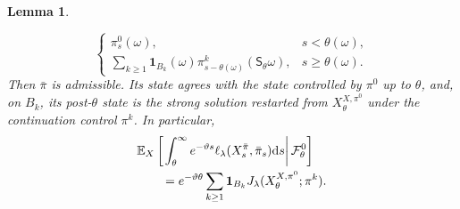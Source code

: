 \documentclass[11pt]{article}
\def\E{\mathbb{E}}
\def\Fc{{\mathcal F}}
\def\id{\mathbf{1}}
\newcommand{\dd}{\mathrm{d}}
\newtheorem{lemma}[theorem]{Lemma}
\theoremstyle{definition}
\theoremstyle{remark}
\numberwithin{equation}{section}
\begin{document}
\begin{lemma}
\begin{enumerate}[label=\textup{(\roman*)},leftmargin=2.3em]
\begin{equation}
\begin{cases}
  \pi_s^0(\omega),&s<\theta(\omega),\\[1mm]
  \displaystyle
  \sum_{k\ge1}\id_{B_k}(\omega)
  \pi_{s-\theta(\omega)}^k(\mathsf S_\theta\omega),
  &s\ge\theta(\omega).
 \end{cases}
\end{equation}
Then $\bar\pi$ is admissible.  Its state agrees with the state controlled by $\pi^0$ up to
$\theta$, and, on $B_k$, its post-$\theta$ state is the strong solution restarted from
$X_\theta^{X,\pi^0}$ under the continuation control $\pi^k$.  In particular,
\begin{align}
 &\E_X\left[
  \left.
  \int_\theta^\infty e^{-\vartheta s}
  \ell_\lambda(X_s^{\bar\pi},\bar\pi_s)\dd s
  \right|\Fc_\theta^0\right]
\notag\\
 &\qquad=e^{-\vartheta\theta}
 \sum_{k\ge1}\id_{B_k}
 J_\lambda(X_\theta^{X,\pi^0};\pi^k).
 \label{eq:conditional-pasted-cost-control}
\end{align}
\end{enumerate}
\end{lemma}
\end{document}

